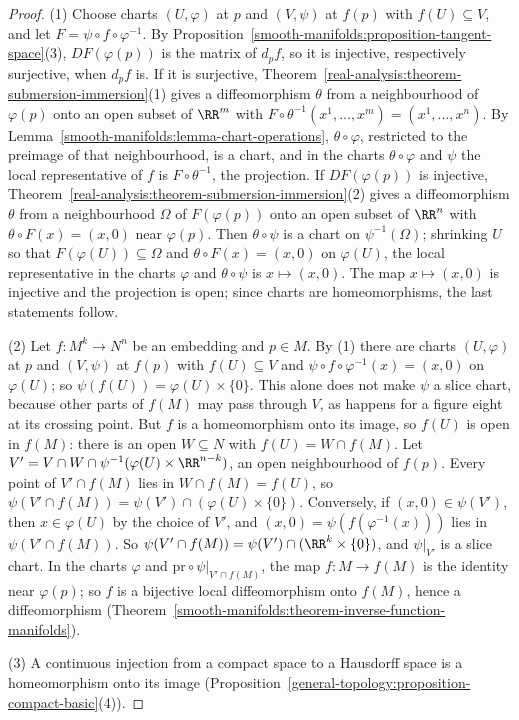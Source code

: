 \begin{proof}
(1) Choose charts $(U, \varphi)$ at $p$ and $(V, \psi)$ at $f(p)$ with $f(U) \subseteq V$, and let $F = \psi \circ f \circ \varphi^{-1}$. By
Proposition~\ref{smooth-manifolds:proposition-tangent-space}(3), $DF(\varphi(p))$ is the matrix of $d_pf$, so it is injective, respectively surjective, when
$d_pf$ is. If it is surjective, Theorem~\ref{real-analysis:theorem-submersion-immersion}(1) gives a diffeomorphism $\theta$ from a neighbourhood of $\varphi(p)$
onto an open subset of $\RR^m$ with $F \circ \theta^{-1}(x^1, \ldots, x^m) = (x^1, \ldots, x^n)$. By Lemma~\ref{smooth-manifolds:lemma-chart-operations},
$\theta \circ \varphi$, restricted to the preimage of that neighbourhood, is a chart, and in the charts $\theta \circ \varphi$ and $\psi$ the local
representative of $f$ is $F \circ \theta^{-1}$, the projection. If $DF(\varphi(p))$ is injective, Theorem~\ref{real-analysis:theorem-submersion-immersion}(2)
gives a diffeomorphism $\theta$ from a neighbourhood $\Omega$ of $F(\varphi(p))$ onto an open subset of $\RR^n$ with $\theta \circ F(x) = (x, 0)$ near
$\varphi(p)$. Then $\theta \circ \psi$ is a chart on $\psi^{-1}(\Omega)$; shrinking $U$ so that $F(\varphi(U)) \subseteq \Omega$ and $\theta \circ F(x) = (x, 0)$
on $\varphi(U)$, the local representative in the charts $\varphi$ and $\theta \circ \psi$ is $x \mapsto (x, 0)$. The map $x \mapsto (x, 0)$ is injective and the
projection is open; since charts are homeomorphisms, the last statements follow.

(2) Let $f \colon M^k \to N^n$ be an embedding and $p \in M$. By (1) there are charts $(U, \varphi)$ at $p$ and $(V, \psi)$ at $f(p)$ with $f(U) \subseteq V$ and
$\psi \circ f \circ \varphi^{-1}(x) = (x, 0)$ on $\varphi(U)$; so $\psi(f(U)) = \varphi(U) \times \{0\}$. This alone does not make $\psi$ a slice chart, because
other parts of $f(M)$ may pass through $V$, as happens for a figure eight at its crossing point. But $f$ is a homeomorphism onto its
image, so $f(U)$ is open in $f(M)$: there is an open $W \subseteq N$ with $f(U) = W \cap f(M)$. Let
$V' = V \cap W \cap \psi^{-1}(\varphi(U) \times \RR^{n-k})$, an open neighbourhood of $f(p)$. Every point of $V' \cap f(M)$ lies in $W \cap f(M) = f(U)$, so
$\psi(V' \cap f(M)) = \psi(V') \cap (\varphi(U) \times \{0\})$. Conversely, if $(x, 0) \in \psi(V')$, then $x \in \varphi(U)$ by the choice of $V'$, and
$(x, 0) = \psi(f(\varphi^{-1}(x)))$ lies in $\psi(V' \cap f(M))$. So $\psi(V' \cap f(M)) = \psi(V') \cap (\RR^k \times \{0\})$, and $\psi|_{V'}$ is a slice
chart. In the charts $\varphi$ and $\mathrm{pr} \circ \psi|_{V' \cap f(M)}$, the map $f \colon M \to f(M)$ is the identity near $\varphi(p)$; so $f$ is a bijective
local diffeomorphism onto $f(M)$, hence a diffeomorphism (Theorem~\ref{smooth-manifolds:theorem-inverse-function-manifolds}).

(3) A continuous injection from a compact space to a Hausdorff space is a homeomorphism onto its image
(Proposition~\ref{general-topology:proposition-compact-basic}(4)).
\end{proof}

